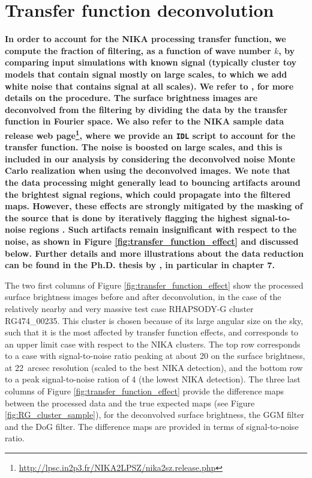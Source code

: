\documentclass[twocolumn,traditabstract]{aa}
\begin{document}
\section{Transfer function deconvolution}\label{sec:Transfer_function_deconvolution}
{\bf In order to account for the NIKA processing transfer function, we compute the fraction of filtering, as a function of wave number $k$, by comparing input simulations with known signal (typically cluster toy models that contain signal mostly on large scales, to which we add white noise that contains signal at all scales). We refer to \cite{Adam2015,Adam2016a}, for more details on the procedure. The surface brightness images are deconvolved from the filtering by dividing the data by the transfer function in Fourier space. We also refer to the NIKA sample data release web page\footnote{\url{http://lpsc.in2p3.fr/NIKA2LPSZ/nika2sz.release.php}}, where we provide an {\tt IDL} script to account for the transfer function. The noise is boosted on large scales, and this is included in our analysis by considering the deconvolved noise Monte Carlo realization when using the deconvolved images. We note that the data processing might generally lead to bouncing artifacts around the brightest signal regions, which could propagate into the filtered maps. However, these effects are strongly mitigated by the masking of the source that is done by iteratively flagging the highest signal-to-noise regions \citep[see][]{Adam2015}. Such artifacts remain insignificant with respect to the noise, as shown in Figure \ref{fig:transfer_function_effect} and discussed below. Further details and more illustrations about the data reduction can be found in the Ph.D. thesis by \cite{Adam2015Thesis}, in particular in chapter 7.

The two first columns of Figure \ref{fig:transfer_function_effect} show the processed surface brightness images before and after deconvolution, in the case of the relatively nearby and very massive test case RHAPSODY-G cluster RG474\_00235. This cluster is chosen because of its large angular size on the sky, such that it is the most affected by transfer function effects, and corresponds to an upper limit case with respect to the NIKA clusters. The top row corresponds to a case with signal-to-noise ratio peaking at about 20 on the surface brightness, at 22~arcsec resolution (scaled to the best NIKA detection), and the bottom row to a peak signal-to-noise ration of 4 (the lowest NIKA detection). The three last columns of Figure \ref{fig:transfer_function_effect} provide the difference maps between the processed data and the true expected maps (see Figure \ref{fig:RG_cluster_sample}), for the deconvolved surface brightness, the GGM filter and the DoG filter. The difference maps are provided in terms of signal-to-noise ratio.

}
\end{document}
